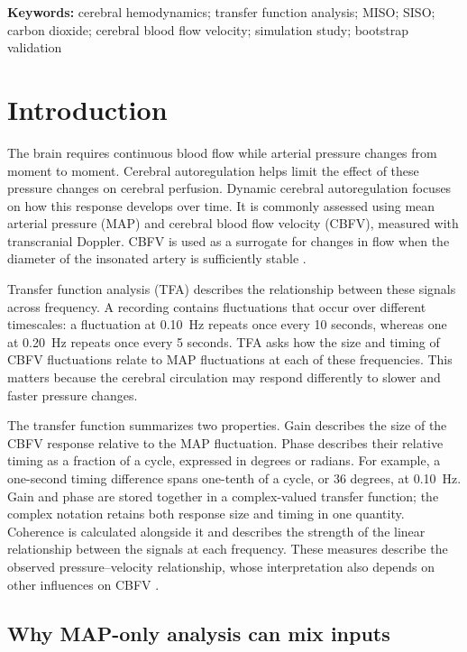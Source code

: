 \documentclass[12pt]{article}
\begin{document}
\noindent\textbf{Keywords:} cerebral hemodynamics; transfer function analysis;
MISO; SISO; carbon dioxide; cerebral blood flow velocity; simulation study;
bootstrap validation

\newpage
\tableofcontents
\newpage

\section{Introduction}

The brain requires continuous blood flow while arterial pressure changes from
moment to moment. Cerebral autoregulation helps limit the effect of these
pressure changes on cerebral perfusion. Dynamic cerebral autoregulation focuses
on how this response develops over time. It is commonly assessed using mean
arterial pressure (MAP) and cerebral blood flow velocity (CBFV), measured with
transcranial Doppler. CBFV is used as a surrogate for changes in flow when the
diameter of the insonated artery is sufficiently stable \cite{Panerai2023}.

Transfer function analysis (TFA) describes the relationship between these
signals across frequency. A recording contains fluctuations that occur over
different timescales: a fluctuation at 0.10~Hz repeats once every 10 seconds,
whereas one at 0.20~Hz repeats once every 5 seconds. TFA asks how the size and
timing of CBFV fluctuations relate to MAP fluctuations at each of these
frequencies. This matters because the cerebral circulation may respond
differently to slower and faster pressure changes.

The transfer function summarizes two properties. Gain describes the size of
the CBFV response relative to the MAP fluctuation. Phase describes their
relative timing as a fraction of a cycle, expressed in degrees or radians.
For example, a one-second timing difference spans one-tenth of a cycle, or
36 degrees, at 0.10~Hz. Gain and phase are stored together in a complex-valued
transfer function; the complex notation retains both response size and timing
in one quantity. Coherence is calculated alongside it and describes the
strength of the linear relationship between the signals at each frequency.
These measures describe the observed pressure--velocity relationship, whose
interpretation also depends on other influences on CBFV \cite{Panerai2023}.

\subsection{Why MAP-only analysis can mix inputs}
\end{document}
